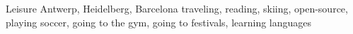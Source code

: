 \documentclass[]{friggeri-cv}
\begin{document}
\begin{entrylist}
  \entry
    {}
    {Leisure}
    {Antwerp, Heidelberg, Barcelona}
    {traveling, reading, skiing, open-source, playing soccer, going to the gym, going to festivals, learning languages}
\end{entrylist}






\end{document}
